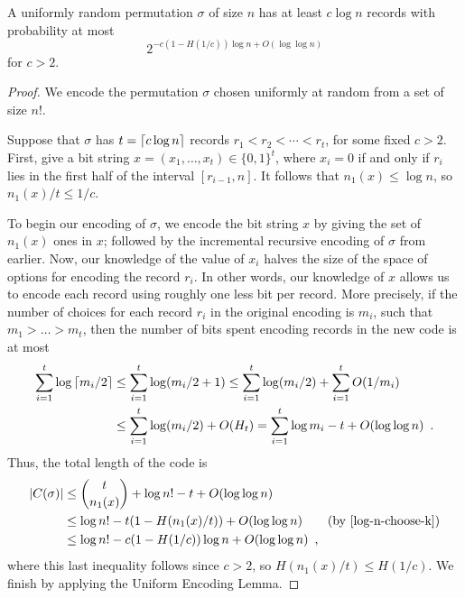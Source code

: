 \documentclass{patmorin}
\begin{document}
\begin{thm}
  A uniformly random permutation $\sigma$ of size $n$ has at least $c
  \log n$ records with probability at most
  \[
    2^{-c (1 - H(1/c)) \log n + O(\log \log n)}
  \]
  for $c > 2$.
\end{thm}
\begin{proof}
  We encode the permutation $\sigma$ chosen uniformly at random from a
  set of size $n!$.

  Suppose that $\sigma$ has $t = {\lceil c\log n \rceil}$ records
  $r_1 < r_2 < \cdots < r_t$, for some fixed $c > 2$. First, give a
  bit string $x = (x_1, \dots, x_t) \in \{0, 1\}^t$, where $x_i = 0$
  if and only if $r_i$ lies in the first half of the interval
  $[r_{i - 1}, n]$. It follows that $n_1(x) \leq \log n$, so
  $n_1(x)/t \leq 1/c$.

  To begin our encoding of $\sigma$, we encode the bit string $x$ by
  giving the set of $n_1(x)$ ones in $x$; followed by the incremental
  recursive encoding of $\sigma$ from earlier. Now, our knowledge of
  the value of $x_i$ halves the size of the space of options for
  encoding the record $r_i$. In other words, our knowledge of $x$
  allows us to encode each record using roughly one less bit per
  record. More precisely, if the number of choices for each record
  $r_i$ in the original encoding is $m_i$, such that $m_1 > \dots >
  m_t$, then the number of bits spent encoding records in the new code
  is at most
  \begin{align*}
    \sum_{i = 1}^t \log {\lceil m_i/2 \rceil} &\leq \sum_{i = 1}^t \log (m_i/2
    + 1)
    \leq \sum_{i = 1}^t \log (m_i/2) + \sum_{i = 1}^t O(1/m_i) \\
    &\leq \sum_{i = 1}^t \log (m_i/2) + O(H_t) = \sum_{i = 1}^t \log
    m_i - t + O(\log \log n) \enspace .
  \end{align*}
  Thus, the total length of the code is
  \begin{align*}
    |C(\sigma)| &\leq \binom{t}{n_1(x)} + \log n! - t + O(\log \log n) \\
                &\leq \log n! - t (1 - H(n_1(x)/t)) + O(\log \log n) \tag{by \eqref{log-n-choose-k}}\\
                &\leq \log n! - c (1 - H(1/c))\log n + O(\log \log n) \enspace ,
  \end{align*}
  where this last inequality follows since $c > 2$, so $H(n_1(x)/t)
  \leq H(1/c)$. We finish by applying the Uniform Encoding Lemma.
\end{proof}
\end{document}
